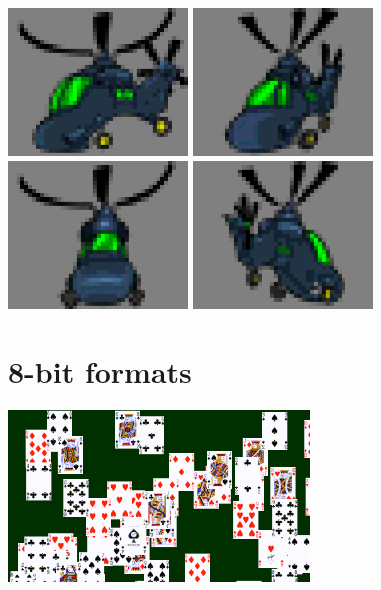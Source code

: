 \documentclass[10pt]{book}
\begin{document}
\begin{center}
\includegraphics[width=135pt]{previews/nightstrike_1-COPTER_FALL-00.png}
\includegraphics[width=135pt]{previews/nightstrike_1-COPTER_FALL-01.png}
\includegraphics[width=135pt]{previews/nightstrike_1-COPTER_FALL-02.png}
\includegraphics[width=135pt]{previews/nightstrike_1-COPTER_FALL-03.png}
\end{center}

\newpage
\section{8-bit formats}
\label{eightbit}

\begin{center}
\includegraphics[width=0.6\textwidth]{0034.png}
\end{center}
\end{document}
